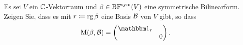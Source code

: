 \documentclass[a4paper, 10pt]{scrartcl}
\begin{document}


\begin{question}[subtitle = Symmetrische Bilinearformen über $\Complex$]
  Es sei $V$ ein $\Complex$-Vektorraum und $\beta \in \operatorname{BF}^{\operatorname{sym}}(V)$ eine symmetrische Bilinearform.
  Zeigen Sie, dass es mit $r \coloneqq \operatorname{rg} \beta$ eine Basis $\mathcal{B}$ von $V$ gibt, so dass
  \[
      \repmatrixbilsame{\beta}{\basis{B}}
    = \begin{pmatrix}
        \Id_r &   \\
              & 0
      \end{pmatrix}.
  \]
\end{question}
\end{document}
